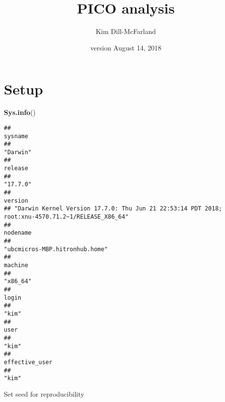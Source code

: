 \documentclass[]{article}
\title{PICO analysis}
\author{Kim Dill-McFarland}
\date{version August 14, 2018}
\newenvironment{Shaded}{\begin{snugshade}}{\end{snugshade}}
\newcommand{\KeywordTok}[1]{\textcolor[rgb]{0.13,0.29,0.53}{\textbf{#1}}}
\newcommand{\NormalTok}[1]{#1}
\begin{document}
\maketitle

{
\setcounter{tocdepth}{2}
\tableofcontents
}
\section{Setup}\label{setup}

\begin{Shaded}
\begin{Highlighting}[]
\KeywordTok{Sys.info}\NormalTok{()}
\end{Highlighting}
\end{Shaded}

\begin{verbatim}
##                                                                                           sysname 
##                                                                                          "Darwin" 
##                                                                                           release 
##                                                                                          "17.7.0" 
##                                                                                           version 
## "Darwin Kernel Version 17.7.0: Thu Jun 21 22:53:14 PDT 2018; root:xnu-4570.71.2~1/RELEASE_X86_64" 
##                                                                                          nodename 
##                                                                    "ubcmicros-MBP.hitronhub.home" 
##                                                                                           machine 
##                                                                                          "x86_64" 
##                                                                                             login 
##                                                                                             "kim" 
##                                                                                              user 
##                                                                                             "kim" 
##                                                                                    effective_user 
##                                                                                             "kim"
\end{verbatim}

Set seed for reproducibility
\end{document}
